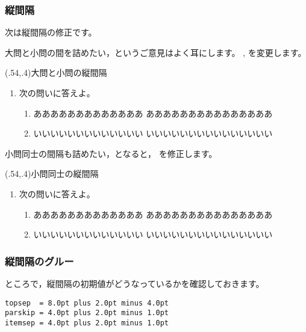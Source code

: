 \documentclass[fleqn,a4j]{jarticle}
\begin{document}
\clearpage

\subsubsection{縦間隔}
次は縦間隔の修正です。

大問と小問の間を詰めたい，というご意見はよく耳にします。
, を変更します。

\begin{showEx}(.54,.4){大問と小問の縦間隔}
\begin{enumerate}[1.~]
  \item 次の問いに答えよ。
    \begin{enumerate}%
    <apnenum={\leftmargin=0zw%
              \itemindent=1zw%
              \topsep=0pt%
              \parskip=0pt%
             }>[(1)]
      \item あああああああああああああ
        あああああああああああああああ
      \item いいいいいいいいいいいいい
        いいいいいいいいいいいいいいい
    \end{enumerate}
\end{enumerate}
\end{showEx}

小問同士の間隔も詰めたい，となると，
を修正します。

\begin{showEx}(.54,.4){小問同士の縦間隔}
\begin{enumerate}[1.~]
  \item 次の問いに答えよ。
    \begin{enumerate}%
    <apnenum={\leftmargin=0zw%
              \itemindent=1zw%
              \topsep=0pt%
              \parskip=0pt%
              \itemsep=0pt%
             }>[(1)]
      \item あああああああああああああ
        あああああああああああああああ
      \item いいいいいいいいいいいいい
        いいいいいいいいいいいいいいい
    \end{enumerate}
\end{enumerate}
\end{showEx}
\clearpage

\subsubsection{縦間隔のグルー}
ところで，縦間隔の初期値がどうなっているかを確認しておきます。

\begin{jquote}
\begin{verbatim}
topsep  = 8.0pt plus 2.0pt minus 4.0pt
parskip = 4.0pt plus 2.0pt minus 1.0pt
itemsep = 4.0pt plus 2.0pt minus 1.0pt
\end{verbatim}
\end{jquote}
\end{document}
